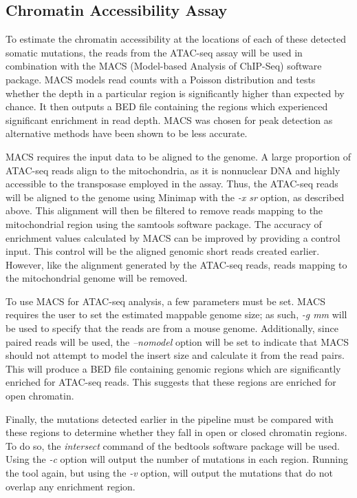 \subsection{Chromatin Accessibility Assay}
To estimate the chromatin accessibility at the locations of each of these detected somatic mutations, the reads from the ATAC-seq assay will be used in combination with the MACS (Model-based Analysis of ChIP-Seq) software package. MACS models read counts with a Poisson distribution and tests whether the depth in a particular region is significantly higher than expected by chance. It then outputs a BED file containing the regions which experienced significant enrichment in read depth. MACS was chosen for peak detection as alternative methods have been shown to be less accurate.

MACS requires the input data to be aligned to the genome. A large proportion of ATAC-seq reads align to the mitochondria, as it is nonnuclear DNA and highly accessible to the transposase employed in the assay. Thus, the ATAC-seq reads will be aligned to the genome using Minimap with the \textit{-x sr} option, as described above. This alignment will then be filtered to remove reads mapping to the mitochondrial region using the samtools software package. The accuracy of enrichment values calculated by MACS can be improved by providing a control input. This control will be the aligned genomic short reads created earlier. However, like the alignment generated by the ATAC-seq reads, reads mapping to the mitochondrial genome will be removed.

To use MACS for ATAC-seq analysis, a few parameters must be set.
MACS requires the user to set the estimated mappable genome size; as such, \textit{-g mm} will be used to specify that the reads are from a mouse genome. Additionally, since paired reads will be used, the \textit{--nomodel} option will be set to indicate that MACS should not attempt to model the insert size and calculate it from the read pairs. This will produce a BED file containing genomic regions which are significantly enriched for ATAC-seq reads. This suggests that these regions are enriched for open chromatin.

Finally, the mutations detected earlier in the pipeline must be compared with these regions to determine whether they fall in open or closed chromatin regions. To do so, the \textit{intersect} command of the bedtools software package will be used. Using the \textit{-c} option will output the number of mutations in each region. Running the tool again, but using the \textit{-v} option, will output the mutations that do not overlap any enrichment region.

